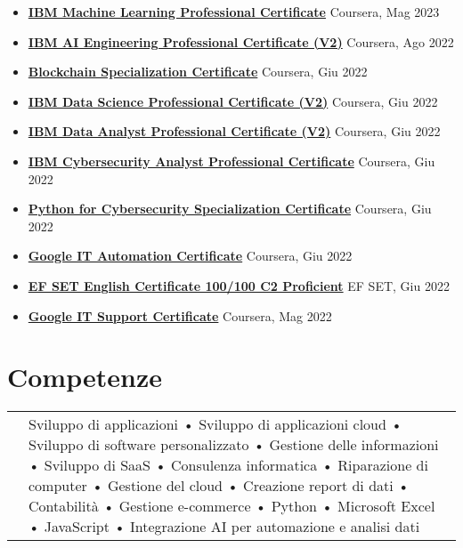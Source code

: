 \documentclass[a4paper,12pt]{article}
\begin{document}
\begin{itemize}[leftmargin=*,itemsep=3pt,parsep=0pt]
\item \textbf{\href{https://www.credly.com/badges/e562c28b-730a-444b-9776-9d1d3429b6a8/linked_in_profile}{IBM Machine Learning Professional Certificate}} \hfill \textnormal{Coursera, Mag 2023}
\item \textbf{\href{https://www.credly.com/badges/40d36ac5-31a2-4ce0-a3c0-b2ea91ff4b64/linked_in_profile}{IBM AI Engineering Professional Certificate (V2)}} \hfill \textnormal{Coursera, Ago 2022}
\item \textbf{\href{https://www.coursera.org/account/accomplishments/specialization/certificate/7RQG4Q277CA2}{Blockchain Specialization Certificate}} \hfill \textnormal{Coursera, Giu 2022}
\item \textbf{\href{https://www.credly.com/badges/41676071-2178-4f58-8db3-3622a90eecfd/linked_in_profile}{IBM Data Science Professional Certificate (V2)}} \hfill \textnormal{Coursera, Giu 2022}
\item \textbf{\href{https://www.credly.com/badges/d7986998-a9ac-4adc-8b2d-cf1edeca2301/linked_in_profile}{IBM Data Analyst Professional Certificate (V2)}} \hfill \textnormal{Coursera, Giu 2022}
\item \textbf{\href{https://www.credly.com/badges/ba500085-e96c-4704-8b80-3d2062089151/linked_in_profile}{IBM Cybersecurity Analyst Professional Certificate}} \hfill \textnormal{Coursera, Giu 2022}
\item \textbf{\href{https://www.coursera.org/account/accomplishments/specialization/certificate/3MEHP7XBU26B}{Python for Cybersecurity Specialization Certificate}} \hfill \textnormal{Coursera, Giu 2022}
\item \textbf{\href{https://www.credly.com/badges/0d6aeb02-1078-4c7b-bdd5-57cc3c2c7d8d/linked_in_profile}{Google IT Automation Certificate}} \hfill \textnormal{Coursera, Giu 2022}
\item \textbf{\href{https://www.efset.org/cert/NeK5Ry}{EF SET English Certificate 100/100 C2 Proficient}} \hfill \textnormal{EF SET, Giu 2022}
\item \textbf{\href{https://www.udemy.com/certificate/UC-250c1c0b-72ce-41ac-bdbc-da21e3e8ee85/}{Google IT Support Certificate}} \hfill \textnormal{Coursera, Mag 2022}


\end{itemize}

\section{Competenze}
\begin{tabularx}{\linewidth}{@{}l X@{}}
&  \normalsize{Sviluppo di applicazioni • Sviluppo di applicazioni cloud • Sviluppo di software personalizzato • Gestione delle informazioni • Sviluppo di SaaS • Consulenza informatica • Riparazione di computer • Gestione del cloud • Creazione report di dati • Contabilità • Gestione e-commerce • Python • Microsoft Excel • JavaScript • Integrazione AI per automazione e analisi dati}\\
\end{tabularx}
\end{document}
